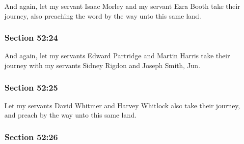 		And again, let my servant Isaac Morley and my servant Ezra Booth take their journey, also preaching the word by the way unto this same land.


	\subsubsection{Section 52:24} %
		\label{DC52-24}

		And again, let my servants Edward Partridge and Martin Harris take their journey with my servants Sidney Rigdon and Joseph Smith, Jun.


	\subsubsection{Section 52:25} %
		\label{DC52-25}

		Let my servants David Whitmer and Harvey Whitlock also take their journey, and preach by the way unto this same land.


	\subsubsection{Section 52:26} %
		\label{DC52-26}

